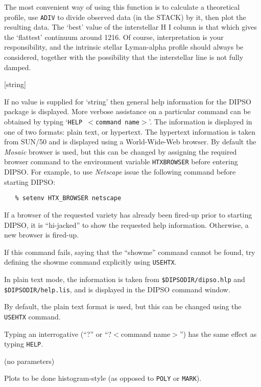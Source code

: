 \documentclass[twoside,11pt]{article}
\newcommand{\htmlref}[2]{#1}
\newcommand{\xlabel}[1]{}
\renewcommand{\_}{\texttt{\symbol{95}}}
\newcommand{\dipcom}[3] { \item [{#1}] {#2} \par }
\newcommand{\dipcom}[3] { \end{description}
                            \subsection{\xlabel{#1}{#1} - {#3}}
                            \label{COM:#1}
                            \begin{description}
                            \item [Syntax:] {\tt{#1} {#2}}
                            \par
                            \item [Description:]}
\begin{document}
\begin {description}
The most convenient way of using this function is to calculate a
theoretical profile, use \htmlref{{\tt{ADIV}}}{COM:ADIV}  to divide observed data (in the STACK)
by it, then plot the resulting data. The `best' value of the
interstellar H I column is that which gives the `flattest' continuum
around 1216. Of course, interpretation is your responsibility, and the
intrinsic stellar Lyman-alpha profile should always be considered,
together with the possibility that the interstellar line is not fully
damped.

\dipcom{HELP}{[string]}{Displays full help on specified commands}
If no value is supplied for `string' then general help information for
the DIPSO package is displayed. More verbose assistance on a particular
command can be obtained by typing `{\tt{HELP} $<$command name$>$}'. The
information is displayed in one of two formats: plain text, or hypertext.
The hypertext information is taken from SUN/50 and is displayed using a
World-Wide-Web browser. By default the {\em Mosaic} browser is used, but
this can be changed by assigning the required browser command to the
environment variable {\tt HTX\_BROWSER} before entering DIPSO. For
example, to use {\em Netscape} issue the following command before
starting DIPSO:

\begin{verbatim}
   % setenv HTX_BROWSER netscape
\end{verbatim}

If a browser of the requested variety has already been fired-up prior to
starting DIPSO, it is ``hi-jacked'' to show the requested help
information. Otherwise, a new browser is fired-up.

If this command fails, saying that the ``showme'' command cannot be found, 
try defining the showme command explicitly using
\htmlref{{\tt{USEHTX}}}{COM:USEHTX}.

In plain text mode, the information is taken from
{\tt{\$DIPSODIR/dipso.hlp}} and {\tt{\$DIPSODIR/help.lis}}, and is
displayed in the DIPSO command window.

By default, the plain text format is used, but this can be changed using the
\htmlref{{\tt{USEHTX}}}{COM:USEHTX} command. 

Typing an interrogative (``?'' or ``?$<$command name$>$'') has the same effect 
as typing {\tt{HELP}}.

\dipcom{HIST}{(no parameters)}{Causes plots to be done in histogram-style}
Plots to be done histogram-style (as opposed to \htmlref{{\tt{POLY}}}{COM:POLY}  or \htmlref{{\tt{MARK}}}{COM:MARK}). 



\end{description}
\end{document}
